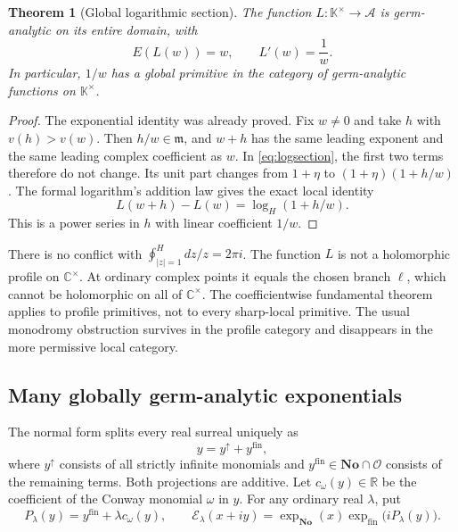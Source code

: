 \documentclass[11pt,a4paper]{article}
\numberwithin{equation}{section}
\newtheorem{theorem}{Theorem}[section]
\theoremstyle{definition}
\newcommand{\No}{\mathbf{No}}
\newcommand{\K}{\mathbb K}
\newcommand{\C}{\mathbb C}
\newcommand{\R}{\mathbb R}
\newcommand{\OO}{\mathcal O}
\newcommand{\mm}{\mathfrak m}
\newcommand{\hoint}{\oint^{\!H}}
\newcommand{\fin}{\mathrm{fin}}
\newcommand{\infp}{\uparrow}
\begin{document}
\begin{theorem}[Global logarithmic section]\label{thm:globallog}
The function $L:\K^\times\to\mathcal A$ is germ-analytic on its entire domain,
with
\[
 E(L(w))=w,\qquad L'(w)=\frac1w.
\]
In particular, $1/w$ has a global primitive in the category of germ-analytic
functions on $\K^\times$.
\end{theorem}
\begin{proof}
The exponential identity was already proved. Fix $w\neq0$ and take
$h$ with $v(h)>v(w)$. Then $h/w\in\mm$, and $w+h$ has the same leading
exponent and the same leading complex coefficient as $w$. In
\eqref{eq:logsection}, the first two terms therefore do not change. Its unit
part changes from $1+\eta$ to $(1+\eta)(1+h/w)$. The formal logarithm's
addition law gives the exact local identity
\begin{equation}\label{eq:global-log-local}
 L(w+h)-L(w)=\log_H(1+h/w).
\end{equation}
This is a power series in $h$ with linear coefficient $1/w$.
\end{proof}

There is no conflict with
$\hoint_{|z|=1}dz/z=2\pi i$. The function $L$ is not a holomorphic profile on
$\C^\times$. At ordinary complex points it equals the chosen branch
$\ell$, which cannot be holomorphic on all of $\C^\times$. The coefficientwise
fundamental theorem applies to profile primitives, not to every sharp-local
primitive. The usual monodromy obstruction survives in the profile category
and disappears in the more permissive local category.

\subsection{Many globally germ-analytic exponentials}

The normal form splits every real surreal uniquely as
\[
 y=y^{\infp}+y^{\fin},
\]
where $y^{\infp}$ consists of all strictly infinite monomials and
$y^{\fin}\in\No\cap\OO$ consists of the remaining terms. Both projections
are additive. Let $c_\omega(y)\in\R$ be the coefficient of the Conway monomial
$\omega$ in $y$. For any ordinary real $\lambda$, put
\[
 P_\lambda(y)=y^{\fin}+\lambda c_\omega(y),\qquad
 \mathcal E_\lambda(x+iy)=
       \exp_{\No}(x)\exp_{\fin}\bigl(iP_\lambda(y)\bigr).
\]
\end{document}
